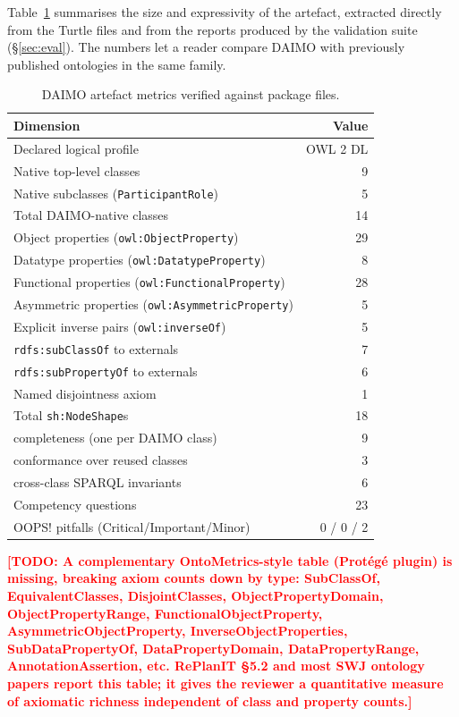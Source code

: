 \documentclass[Afour,sagev,times]{sagej}
\newcommand{\code}[1]{\texttt{#1}}
\newcommand{\TODO}[1]{\textcolor{red}{\textbf{[TODO: #1]}}}
\begin{document}
Table~\ref{tab:metrics} summarises the size and expressivity of the artefact, extracted directly from the Turtle files and from the reports produced by the validation suite (§\ref{sec:eval}). The numbers let a reader compare DAIMO with previously published ontologies in the same family.

\begin{table}[t]
\small\sf\centering
\caption{DAIMO artefact metrics verified against package files.\label{tab:metrics}}
\begin{tabular}{@{}p{4.6cm}r@{}}
\toprule
\textbf{Dimension} & \textbf{Value} \\
\midrule
Declared logical profile & OWL 2 DL \\
Native top-level classes & 9 \\
Native subclasses (\code{ParticipantRole}) & 5 \\
Total DAIMO-native classes & 14 \\
Object properties (\code{owl:ObjectProperty}) & 29 \\
Datatype properties (\code{owl:DatatypeProperty}) & 8 \\
Functional properties (\code{owl:FunctionalProperty}) & 28 \\
Asymmetric properties (\code{owl:AsymmetricProperty}) & 5 \\
Explicit inverse pairs (\code{owl:inverseOf}) & 5 \\
\code{rdfs:subClassOf} to externals & 7 \\
\code{rdfs:subPropertyOf} to externals & 6 \\
Named disjointness axiom & 1 \\
Total \code{sh:NodeShape}s & 18 \\
\quad completeness (one per DAIMO class) & 9 \\
\quad conformance over reused classes & 3 \\
\quad cross-class SPARQL invariants & 6 \\
Competency questions & 23 \\
OOPS! pitfalls (Critical/Important/Minor) & 0 / 0 / 2 \\
\bottomrule
\end{tabular}
\end{table}

\TODO{A complementary OntoMetrics-style table (Prot\'eg\'e plugin) is missing, breaking axiom counts down by type: SubClassOf, EquivalentClasses, DisjointClasses, ObjectPropertyDomain, ObjectPropertyRange, FunctionalObjectProperty, AsymmetricObjectProperty, InverseObjectProperties, SubDataPropertyOf, DataPropertyDomain, DataPropertyRange, AnnotationAssertion, etc. RePlanIT §5.2 and most SWJ ontology papers report this table; it gives the reviewer a quantitative measure of axiomatic richness independent of class and property counts.}
\end{document}
